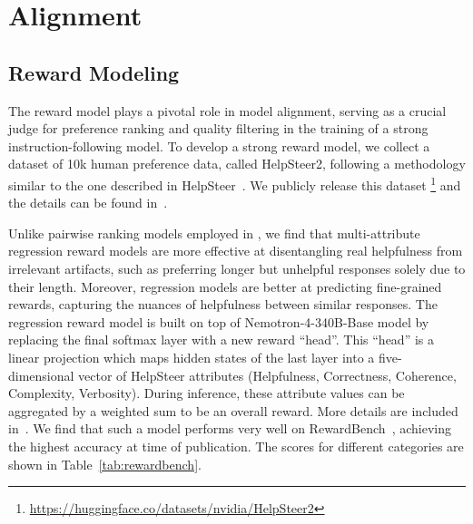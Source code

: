 \documentclass[11pt]{article}
\newcommand{\ours}{Nemotron-4-340B-Base}
\begin{document}
\section{Alignment}


\subsection{Reward Modeling}
\label{sec:reward}
The reward model plays a pivotal role in model alignment, serving as a crucial judge for preference ranking and quality filtering in the training of a strong instruction-following model. 
To develop a strong reward model, we collect a dataset of 10k human preference data, called HelpSteer2, following a methodology similar to the one described in HelpSteer~\citep{wang2023helpsteer}. We publicly release this dataset \footnote{\url{https://huggingface.co/datasets/nvidia/HelpSteer2}} and the details can be found in~\citet{helpsteer2}.

Unlike pairwise ranking models employed in \citet{ouyang2022training,touvron2023llama2}, we find that multi-attribute regression reward models are more effective at disentangling real helpfulness from irrelevant artifacts, such as preferring longer but unhelpful responses solely due to their length. Moreover, regression models are better at predicting fine-grained rewards, capturing the nuances of helpfulness between similar responses.
The regression reward model is built on top of \ours{} model by replacing the final softmax layer with a new reward ``head''. 
This ``head'' is a linear projection which maps hidden states of the last layer into a five-dimensional vector of HelpSteer attributes (Helpfulness, Correctness, Coherence, Complexity, Verbosity). 
During inference, these attribute values can be aggregated by a weighted sum to be an overall reward. More details are included in~\citet{helpsteer2}. We find that such a model performs very well on RewardBench~\citep{lambert2024rewardbench}, achieving the highest accuracy at time of publication. The scores for different categories are shown in Table~\ref{tab:rewardbench}.
\end{document}
